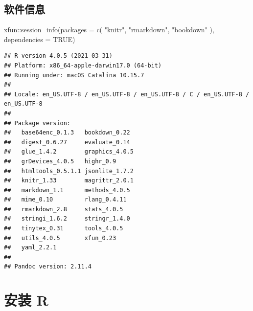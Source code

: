\documentclass[
  10pt,
  b5paper,
  UTF8,twoside,openany,table]{book}
\newenvironment{Shaded}{\begin{snugshade}}{\end{snugshade}}
\newcommand{\AttributeTok}[1]{\textcolor[rgb]{0.77,0.63,0.00}{#1}}
\newcommand{\ConstantTok}[1]{\textcolor[rgb]{0.00,0.00,0.00}{#1}}
\newcommand{\FunctionTok}[1]{\textcolor[rgb]{0.00,0.00,0.00}{#1}}
\newcommand{\NormalTok}[1]{#1}
\newcommand{\SpecialCharTok}[1]{\textcolor[rgb]{0.00,0.00,0.00}{#1}}
\newcommand{\StringTok}[1]{\textcolor[rgb]{0.31,0.60,0.02}{#1}}
\begin{document}
\hypertarget{session}{%
\section*{软件信息}\label{session}}


\begin{Shaded}
\begin{Highlighting}[]
\NormalTok{xfun}\SpecialCharTok{::}\FunctionTok{session\_info}\NormalTok{(}\AttributeTok{packages =} \FunctionTok{c}\NormalTok{(}
  \StringTok{"knitr"}\NormalTok{, }\StringTok{"rmarkdown"}\NormalTok{, }\StringTok{"bookdown"}
\NormalTok{), }\AttributeTok{dependencies =} \ConstantTok{TRUE}\NormalTok{)}
\end{Highlighting}
\end{Shaded}

\begin{verbatim}
## R version 4.0.5 (2021-03-31)
## Platform: x86_64-apple-darwin17.0 (64-bit)
## Running under: macOS Catalina 10.15.7
## 
## Locale: en_US.UTF-8 / en_US.UTF-8 / en_US.UTF-8 / C / en_US.UTF-8 / en_US.UTF-8
## 
## Package version:
##   base64enc_0.1.3   bookdown_0.22    
##   digest_0.6.27     evaluate_0.14    
##   glue_1.4.2        graphics_4.0.5   
##   grDevices_4.0.5   highr_0.9        
##   htmltools_0.5.1.1 jsonlite_1.7.2   
##   knitr_1.33        magrittr_2.0.1   
##   markdown_1.1      methods_4.0.5    
##   mime_0.10         rlang_0.4.11     
##   rmarkdown_2.8     stats_4.0.5      
##   stringi_1.6.2     stringr_1.4.0    
##   tinytex_0.31      tools_4.0.5      
##   utils_4.0.5       xfun_0.23        
##   yaml_2.2.1       
## 
## Pandoc version: 2.11.4
\end{verbatim}

\hypertarget{appendix}{%
\appendix}


\hypertarget{chap-installation}{%
\chapter{安装 R}\label{chap-installation}}

\backmatter
\printindex

  
\end{document}
